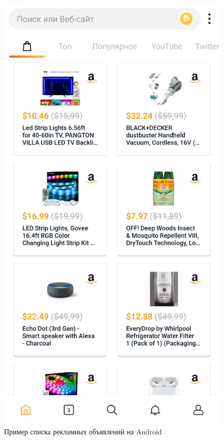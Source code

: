 \documentclass[specification,annotation,times]{itmo-student-thesis}
\begin{document}
\begin{figure}[h]
\caption{Пример списка рекламных объявлений на Android}
\includegraphics[height=0.35\paperheight]{products-feed-android}
\centering
\end{figure}
\end{document}
